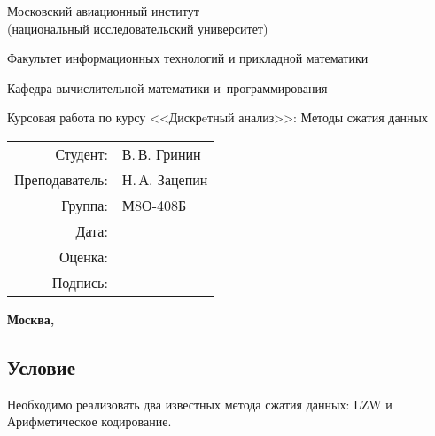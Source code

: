 \documentclass[12pt]{article}
\begin{document}
	\begin{titlepage}
		\begin{center}
			\bfseries
			
			{\Large Московский авиационный институт\\ (национальный исследовательский университет)
				
			}
			
			\vspace{48pt}
			
			{\large Факультет информационных технологий и прикладной математики
			}
			
			\vspace{36pt}
			
			
			{\large Кафедра вычислительной математики и~программирования
				
			}
			
			
			\vspace{48pt}
			
			Курсовая работа по курсу <<Дискрeтный анализ>>: Методы сжатия данных
		\end{center}
		
		\vspace{72pt}
		
		\begin{flushright}
			\begin{tabular}{rl}
				Студент: & В.\,В. Гринин  \\
				Преподаватель: & Н.\,А. Зацепин \\
				Группа: & М8О-408Б \\
				Дата: & \\
				Оценка: & \\
				Подпись: & \\
			\end{tabular}
		\end{flushright}
		
		\vfill
		
		\begin{center}
			\bfseries
			Москва, \the\year
		\end{center}
	\end{titlepage}
	
	\pagebreak
	
	\subsection*{Условие}
	
	Необходимо реализовать два известных метода сжатия данных: LZW и Арифметическое кодирование. 
	
\end{document}
